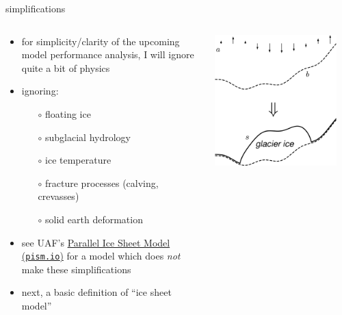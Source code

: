 \documentclass[svgnames,
               hyperref={colorlinks,citecolor=DeepPink4,linkcolor=FireBrick,urlcolor=Maroon},
               usepdftitle=false]  %
               {beamer}
\begin{document}
\begin{frame}{simplifications}

\begin{columns}
\begin{column}{0.6\textwidth}
\begin{itemize}
\item for simplicity/clarity of the upcoming model performance analysis, I will ignore quite a bit of physics
\item \alert{ignoring}:
    \begin{itemize}
    \item[$\circ$] floating ice
    \item[$\circ$] subglacial hydrology
    \item[$\circ$] ice temperature
    \item[$\circ$] fracture processes (calving, crevasses)
    \item[$\circ$] solid earth deformation
    \end{itemize}

\medskip
\item<2> {\footnotesize see UAF's \href{https://pism.io/}{Parallel Ice Sheet Model (\texttt{pism.io})} for a model which does \emph{not} make these simplifications}
\item<2> {\footnotesize next, a basic definition of ``ice sheet model''}
\end{itemize}
\end{column}
\begin{column}{0.42\textwidth}
\hfill \includegraphics[width=0.9\textwidth]{images/map-glacier-ice.png}
\end{column}
\end{columns}
\end{frame}
\end{document}
